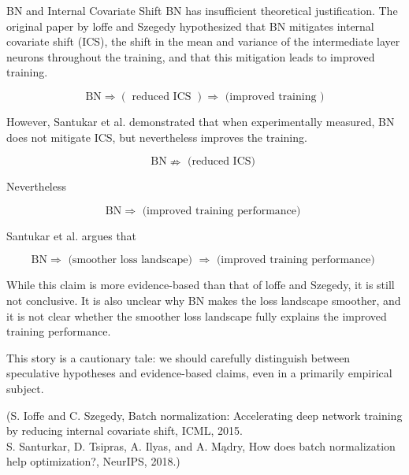 \begin{frame}[allowframebreaks]

\begin{myconceptblock}{6.51}{BN and Internal Covariate Shift}
    BN has insufficient theoretical justification.
    The original paper by loffe and Szegedy hypothesized that BN mitigates internal covariate shift (ICS), the shift in the mean and variance of the intermediate layer neurons throughout the training, and that this mitigation leads to improved training.

    $$
    \mathrm{BN} \Rightarrow(\text { reduced ICS }) \Rightarrow \text { (improved training })
    $$

    However, Santukar et al. demonstrated that when experimentally measured, BN does not mitigate ICS, but nevertheless improves the training.

    $$
    \mathrm{BN} \nRightarrow \text { (reduced ICS) }
    $$

    Nevertheless

    $$
    \mathrm{BN} \Rightarrow \text { (improved training performance) }
    $$

    Santukar et al. argues that

    $$
    \mathrm{BN} \Rightarrow \text { (smoother loss landscape) } \Rightarrow \text { (improved training performance) }
    $$

    While this claim is more evidence-based than that of loffe and Szegedy, it is still not conclusive. It is also unclear why BN makes the loss landscape smoother, and it is not clear whether the smoother loss landscape fully explains the improved training performance.

    This story is a cautionary tale: we should carefully distinguish between speculative hypotheses and evidence-based claims, even in a primarily empirical subject.

    (S. Ioffe and C. Szegedy, Batch normalization: Accelerating deep network training by reducing internal covariate shift, ICML, 2015.\\
    S. Santurkar, D. Tsipras, A. Ilyas, and A. Mądry, How does batch normalization help optimization?, NeurIPS, 2018.)
\end{myconceptblock}

\end{frame}

